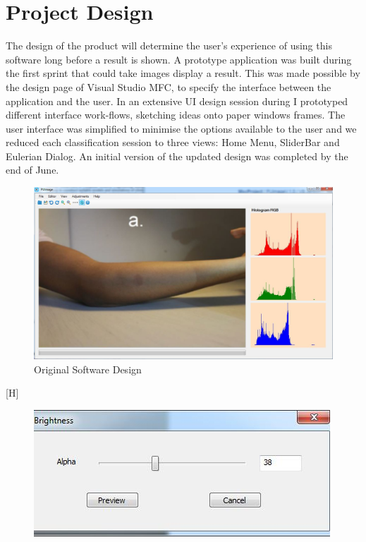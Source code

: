 \chapter{Project Design} \label{chapter:model}

The design of the product will determine the user’s experience of using this software long before a result is shown. A prototype application was built during the first sprint that could take images display a result. This was made possible by the design page of Visual Studio MFC, to specify the interface between the application and the user. In an extensive UI design session during I prototyped different interface work-flows, sketching ideas onto paper windows frames. The user interface was simplified to minimise the options available to the user and we reduced each classification session to three views: Home Menu, SliderBar and Eulerian Dialog. An initial version of the updated design was completed by the end of June. 
\begin{figure}[!htb]
	\centering
	\includegraphics[scale=0.5]{img/originalProject}
	\caption{Original Software Design}
\end{figure}[H]

\begin{figure}[!ht]
	\centering
	\includegraphics[scale=0.6]{img/brightdialog}
\end{figure}

